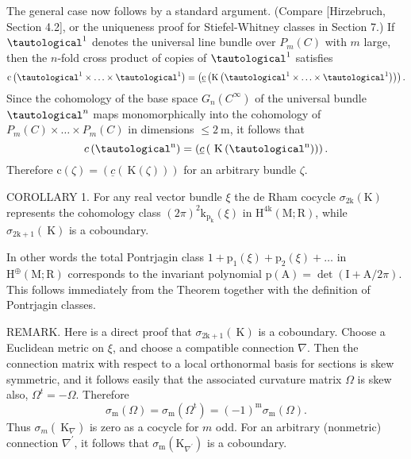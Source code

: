 \documentclass[10pt]{article}
\begin{document}
The general case now follows by a standard argument. (Compare [Hirzebruch, Section 4.2], or the uniqueness proof for Stiefel-Whitney classes in Section 7.) If $\tautological^{1}$ denotes the universal line bundle over $P_{m}(C)$ with $m$ large, then the $n$-fold cross product of copies of $\tautological^{1}$ satisfies
$$
\mathrm{c}\left(\tautological^{1} \times \ldots \times \tautological^{1}\right)=\left(\underline{\mathrm{c}}\left(\mathrm{K}\left(\tautological^{1} \times \ldots \times \tautological^{1}\right)\right)\right) .
$$
Since the cohomology of the base space $G_{n}\left(C^{\infty}\right)$ of the universal bundle $\tautological^{n}$ maps monomorphically into the cohomology of $P_{m}(C) \times \ldots \times P_{m}(C)$ in dimensions $\leq 2 \mathrm{~m}$, it follows that
$$
c\left(\tautological^{\mathrm{n}}\right)=\left(\underline{c}\left(\mathrm{~K}\left(\tautological^{\mathrm{n}}\right)\right)\right) .
$$
Therefore $\mathrm{c}(\zeta)=(\underline{c}(\mathrm{~K}(\zeta)))$ for an arbitrary bundle $\zeta$.

COROLLARY 1. For any real vector bundle $\xi$ the de Rham cocycle $\sigma_{2 \mathrm{k}}(\mathrm{K})$ represents the cohomology class $(2 \pi)^{2} \mathrm{k}_{\mathrm{p}_{\mathrm{k}}}(\xi)$ in $\mathrm{H}^{4 \mathrm{k}}(\mathrm{M} ; \mathrm{R})$, while $\sigma_{2 \mathrm{k}+1}(\mathrm{~K})$ is a coboundary.

In other words the total Pontrjagin class $1+\mathrm{p}_{1}(\xi)+\mathrm{p}_{2}(\xi)+\ldots$ in $\mathrm{H}^{\oplus}(\mathrm{M} ; \mathrm{R})$ corresponds to the invariant polynomial $\mathrm{p}(\mathrm{A})=\operatorname{det}(\mathrm{I}+\mathrm{A} / 2 \pi)$. This follows immediately from the Theorem together with the definition of Pontrjagin classes.

REMARK. Here is a direct proof that $\sigma_{2 \mathrm{k}+1}(\mathrm{~K})$ is a coboundary. Choose a Euclidean metric on $\xi$, and choose a compatible connection $\nabla$. Then the connection matrix with respect to a local orthonormal basis for sections is skew symmetric, and it follows easily that the associated curvature matrix $\Omega$ is skew also, $\Omega^{t}=-\Omega$. Therefore
$$
\sigma_{\mathrm{m}}(\Omega)=\sigma_{\mathrm{m}}\left(\Omega^{\mathrm{t}}\right)=(-1)^{\mathrm{m}} \sigma_{\mathrm{m}}(\Omega) .
$$
Thus $\sigma_{m}\left(\mathrm{~K}_{\nabla}\right)$ is zero as a cocycle for $m$ odd. For an arbitrary (nonmetric) connection $\nabla^{\prime}$, it follows that $\sigma_{\mathrm{m}}\left(\mathrm{K}_{\nabla^{\prime}}\right)$ is a coboundary.
\end{document}
